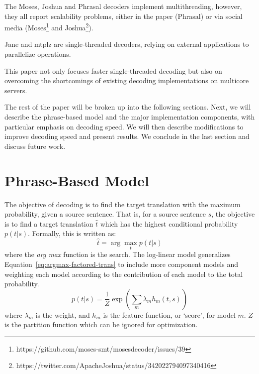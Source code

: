 \documentclass[11pt]{article}
\begin{document}
The Moses, Joshua and Phrasal decoders implement multithreading, however, they all report scalability problems, either in the paper (Phrasal) or via social media (Moses\footnote{\scriptsize https://github.com/moses-smt/mosesdecoder/issues/39} and Joshua\footnote{\scriptsize https://twitter.com/ApacheJoshua/status/342022794097340416}).

Jane and mtplz are single-threaded decoders, relying on external applications to parallelize operations. %

This paper not only focuses faster single-threaded decoding but also on overcoming the shortcomings of existing decoding implementations on multicore servers.

The rest of the paper will be broken up into the following sections. Next, we will describe the phrase-based model and the major implementation components, with particular emphasis on decoding speed. We will then describe modifications to improve decoding speed and present results. We conclude in the last section and discuss future work.

\section{Phrase-Based Model}

The objective of decoding is to find the target translation with the maximum probability, given a source sentence. That is, for a source sentence $s$, the objective is to find a target translation $\hat{t}$ which has the highest conditional probability $p(t | s)$. Formally, this is written as:
\begin{equation}
\hat{t} = \arg \max_t p( t | s )
\label{eq:argmax-factored-trans}
\end{equation}
where the \emph{arg max} function is the search. The log-linear model generalizes Equation~\ref{eq:argmax-factored-trans} to include more component models and weighting each model according to the contribution of each model to the total probability. 
\begin{equation}
\label{eq:Log-Linear}
p(t | s) 	=  \frac{1}{Z} \exp ( \sum_m \lambda_m h_m ( t, s)^{} )
\end{equation}
where $\lambda_m$ is the weight, and $h_m$ is the feature function, or `score', for model $m$. $Z$ is the partition function which can be ignored for optimization. 
\end{document}
